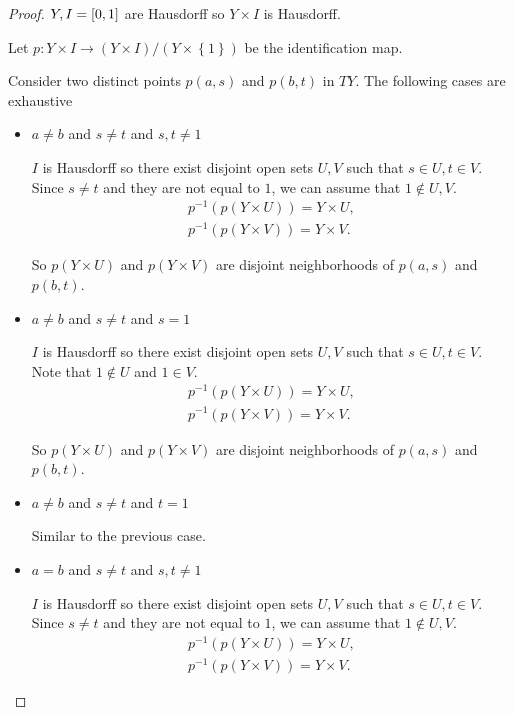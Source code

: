 \begin{proof}
	\( Y, I = \left\lbrack{0,1}\right\rbrack \) are Hausdorff so \( Y \times I \) is Hausdorff.

	Let \( p: Y \times I \to (Y \times I)/(Y \times \left\{ 1 \right\}) \) be the identification map.

	Consider two distinct points \( p(a, s) \) and \( p(b, t) \) in \( TY \). The following cases are exhaustive
	\begin{itemize}
		\item \( a \ne b \) and \( s \ne t \) and \( s, t \ne 1 \)

		      \( I \) is Hausdorff so there exist disjoint open sets \( U, V \) such that \( s \in U, t \in V \). Since \( s \ne t \) and they are not equal to \( 1 \), we can assume that \( 1 \notin U, V \).
		      \[
			      \begin{split}
				      p^{-1}(p(Y \times U)) = Y \times U, \\
				      p^{-1}(p(Y \times V)) = Y \times V.
			      \end{split}
		      \]

		      So \( p(Y \times U) \) and \( p(Y \times V) \) are disjoint neighborhoods of \( p(a, s) \) and \( p(b, t) \).
		\item \( a \ne b \) and \( s \ne t \) and \( s = 1 \)

		      \( I \) is Hausdorff so there exist disjoint open sets \( U, V \) such that \( s \in U, t \in V \). Note that \( 1 \notin U \) and \( 1 \in V \).
		      \[
			      \begin{split}
				      p^{-1}(p(Y \times U)) = Y \times U, \\
				      p^{-1}(p(Y \times V)) = Y \times V.
			      \end{split}
		      \]

		      So \( p(Y \times U) \) and \( p(Y \times V) \) are disjoint neighborhoods of \( p(a, s) \) and \( p(b, t) \).
		\item \( a \ne b \) and \( s \ne t \) and \( t = 1 \)

		      Similar to the previous case.
		\item \( a = b \) and \( s \ne t \) and \( s, t \ne 1 \)

		      \( I \) is Hausdorff so there exist disjoint open sets \( U, V \) such that \( s \in U, t \in V \). Since \( s \ne t \) and they are not equal to \( 1 \), we can assume that \( 1 \notin U, V \).
		      \[
			      \begin{split}
				      p^{-1}(p(Y \times U)) = Y \times U, \\
				      p^{-1}(p(Y \times V)) = Y \times V.
			      \end{split}
		      \]


\end{itemize}
\end{proof}
